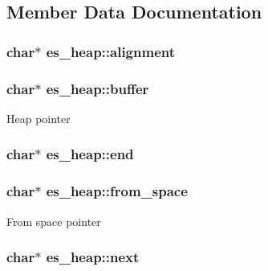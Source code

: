 \subsection{Member Data Documentation}
\hypertarget{structes__heap_a29cd92b0a308c43c32ffa63804d6c18f}{
\subsubsection[{alignment}]{\setlength{\rightskip}{0pt plus 5cm}char$\ast$ es\-\_\-heap\-::alignment}}\label{structes__heap_a29cd92b0a308c43c32ffa63804d6c18f}
\hypertarget{structes__heap_afec48a227febf62eb6020b0f763cd4ad}{
\subsubsection[{buffer}]{\setlength{\rightskip}{0pt plus 5cm}char$\ast$ es\-\_\-heap\-::buffer}}\label{structes__heap_afec48a227febf62eb6020b0f763cd4ad}
Heap pointer \hypertarget{structes__heap_af8b4dd2b90b26223ec8fe81943a380d8}{
\subsubsection[{end}]{\setlength{\rightskip}{0pt plus 5cm}char$\ast$ es\-\_\-heap\-::end}}\label{structes__heap_af8b4dd2b90b26223ec8fe81943a380d8}
\hypertarget{structes__heap_adb394bd40473dacd3a85497a76939c7d}{
\subsubsection[{from\-\_\-space}]{\setlength{\rightskip}{0pt plus 5cm}char$\ast$ es\-\_\-heap\-::from\-\_\-space}}\label{structes__heap_adb394bd40473dacd3a85497a76939c7d}
From space pointer \hypertarget{structes__heap_a0764a90d3c698f3bd3f50ec64ae15808}{
\subsubsection[{next}]{\setlength{\rightskip}{0pt plus 5cm}char$\ast$ es\-\_\-heap\-::next}}\label{structes__heap_a0764a90d3c698f3bd3f50ec64ae15808}
